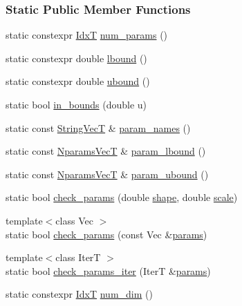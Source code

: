 \subsubsection*{Static Public Member Functions}
\begin{DoxyCompactItemize}
\item 
static constexpr \hyperlink{namespaceprior__hessian_aa8d589f74e88bfa3b5750118acd1ab78}{IdxT} \hyperlink{classprior__hessian_1_1GammaDist_a0cec4c18ea364d226dd9e3feae8b5c37}{num\+\_\+params} ()
\item 
static constexpr double \hyperlink{classprior__hessian_1_1GammaDist_ade738352c5a0e12da9d4fd2a09aafbf7}{lbound} ()
\item 
static constexpr double \hyperlink{classprior__hessian_1_1GammaDist_a7292a1f23badc19d8c608d3a32fc6400}{ubound} ()
\item 
static bool \hyperlink{classprior__hessian_1_1GammaDist_a0e0fe0e81f433350f8dee730e8fc34f8}{in\+\_\+bounds} (double u)
\item 
static const \hyperlink{namespaceprior__hessian_a61fc0176249462ee94fe3cca92cf3f8c}{String\+VecT} \& \hyperlink{classprior__hessian_1_1GammaDist_a92f2a82c562d6cc27712a4c58936985d}{param\+\_\+names} ()
\item 
static const \hyperlink{classprior__hessian_1_1GammaDist_a01fd80ddf66dbb4eedb73e5ee272e838}{Nparams\+VecT} \& \hyperlink{classprior__hessian_1_1GammaDist_ace286d40ebc68be2f4d8bd9e7b1ccd8b}{param\+\_\+lbound} ()
\item 
static const \hyperlink{classprior__hessian_1_1GammaDist_a01fd80ddf66dbb4eedb73e5ee272e838}{Nparams\+VecT} \& \hyperlink{classprior__hessian_1_1GammaDist_a16b8a273203969808d0004b051b484a5}{param\+\_\+ubound} ()
\item 
static bool \hyperlink{classprior__hessian_1_1GammaDist_aee83cfdf65aa5f0c9aab22e6a34a5294}{check\+\_\+params} (double \hyperlink{classprior__hessian_1_1GammaDist_a2c8b6939f7920e2e81532b5c1970567a}{shape}, double \hyperlink{classprior__hessian_1_1GammaDist_a455e42461877165e4101f9f7f33ae84d}{scale})
\item 
{\footnotesize template$<$class Vec $>$ }\\static bool \hyperlink{classprior__hessian_1_1GammaDist_a513f27079b1403f288805cecfd1f6c13}{check\+\_\+params} (const Vec \&\hyperlink{classprior__hessian_1_1GammaDist_a8d30af8f996353fdae1d19a43bf6b016}{params})
\item 
{\footnotesize template$<$class IterT $>$ }\\static bool \hyperlink{classprior__hessian_1_1GammaDist_a9000e6fd6599a8c687ebd2c670a2cfde}{check\+\_\+params\+\_\+iter} (IterT \&\hyperlink{classprior__hessian_1_1GammaDist_a8d30af8f996353fdae1d19a43bf6b016}{params})
\item 
static constexpr \hyperlink{namespaceprior__hessian_aa8d589f74e88bfa3b5750118acd1ab78}{IdxT} \hyperlink{classprior__hessian_1_1UnivariateDist_a688fb42b0a1908ecb758c568c0d8462f}{num\+\_\+dim} ()
\end{DoxyCompactItemize}
